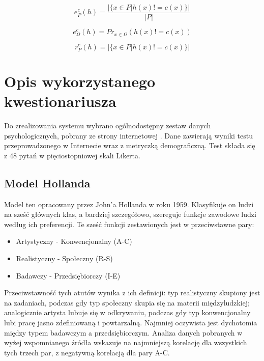 \documentclass[12pt,a4paper,oneside]{report} %
\begin{document}
\begin{equation}
e_P^c(h) = \frac{| \{ x \in P | h(x) != c(x) \} |}{|P|}
\end{equation}
\label{bp}

\begin{equation}
e_\Omega^c (h) = Pr_{x \in \Omega}(h(x) != c(x))
\end{equation}
\label{br}

\begin{equation}
r_P^c(h) = | \{ x \in P | h(x) != c(x) \} | 
\end{equation}
\label{lp}

\chapter{Opis wykorzystanego kwestionariusza}

Do zrealizowania systemu wybrano ogólnodostępny zestaw danych psychologicznych, pobrany ze strony internetowej \cite{raw_data}. Dane zawierają wyniki testu przeprowadzonego w Internecie wraz z metryczką demograficzną. Test składa się z 48 pytań w pięciostopniowej skali Likerta.\par

\section{Model Hollanda}

Model ten opracowany przez John'a Hollanda w roku 1959. \cite{holland-source} Klasyfikuje on ludzi na sześć głównych klas, a bardziej szczegółowo, szereguje funkcje zawodowe ludzi według ich preferencji. Te sześć funkcji zestawionych jest w przeciwstawne pary:\par

\begin{itemize}
\item Artystyczny - Konwencjonalny (A-C)
\item Realistyczny - Społeczny (R-S)
\item Badawczy - Przedsiębiorczy (I-E)
\end{itemize}

Przeciwstawność tych atutów wynika z ich definicji: typ realistyczny skupiony jest na zadaniach, podczas gdy typ społeczny skupia się na materii międzyludzkiej; analogicznie artysta lubuje się w odkrywaniu, podczas gdy typ konwencjonalny lubi pracę jasno zdefiniowaną i powtarzalną. Najmniej oczywista jest dychotomia między typem badawczym a przedsiębiorczym. Analiza danych pobranych w wyżej wspomnianego źródła wskazuje na najmniejszą korelację dla wszystkich tych trzech par, z negatywną korelacją dla pary A-C.\par
\end{document}
